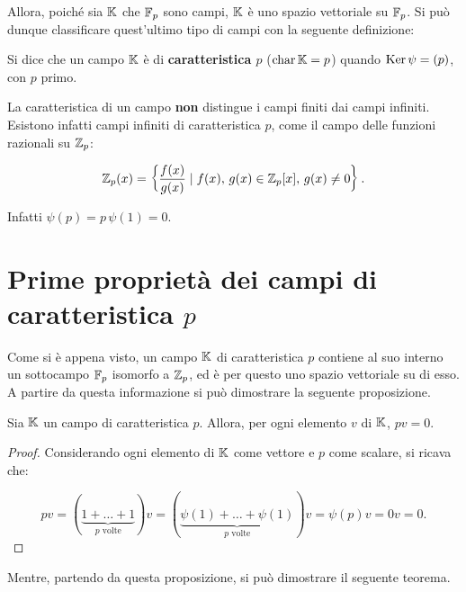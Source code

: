 \documentclass[11pt]{scrbook}
\begin{document}
Allora, poiché sia $\mathbb{K}$ che $\mathbb{F}_p$ sono campi, $\mathbb{K}$ è uno spazio
vettoriale su $\mathbb{F}_p$. Si può dunque classificare quest'ultimo tipo di
campi con la seguente definizione:

\begin{definition}
    Si dice che un campo $\mathbb{K}$ è di \textbf{caratteristica $p$} ($\operatorname{char} \mathbb{K} = p$)
    quando $\operatorname{Ker} \psi = (p)$, con $p$ primo.
\end{definition}

\begin{remark*}
    La caratteristica di un campo \textbf{non} distingue i campi finiti
    dai campi infiniti. Esistono infatti campi infiniti di caratteristica
    $p$, come il campo delle funzioni razionali su $\mathbb{Z}_p$:

    \[ \mathbb Z_p(x) =  \left\{ \frac{f(x)}{g(x)} \mid f(x),\, g(x) \in \mathbb{Z}_p[x],\, g(x) \neq 0 \right\}. \]

    \vskip 0.1in

    Infatti $\psi(p) = p \, \psi(1) = 0$.
\end{remark*}

\section{Prime proprietà dei campi di caratteristica \texorpdfstring{$p$}{p}}

Come si è appena visto, un campo $\mathbb{K}$ di caratteristica $p$ contiene
al suo interno un sottocampo $\mathbb{F}_p$ isomorfo a $\mathbb{Z}_p$, ed è per questo
uno spazio vettoriale su di esso. A partire da questa informazione si
può dimostrare la seguente proposizione.

\begin{proposition}
    \label{prop:campo_char_p_prodotto_per_p}
    Sia $\mathbb{K}$ un campo di caratteristica $p$. Allora, per ogni
    elemento $v$ di $\mathbb{K}$, $pv=0$.
\end{proposition}

\begin{proof}
    Considerando ogni elemento di $\mathbb{K}$ come vettore e $p$ come
    scalare, si ricava che:

    \[ pv=(\underbrace{1+\ldots+1}_{p\text{ volte}})v=
        (\underbrace{\psi(1)+\ldots+\psi(1)}_{p\text{ volte}})v=
        \psi(p)v=0v=0. \]

\end{proof}

Mentre, partendo da questa proposizione, si può dimostrare il
seguente teorema.
\end{document}
